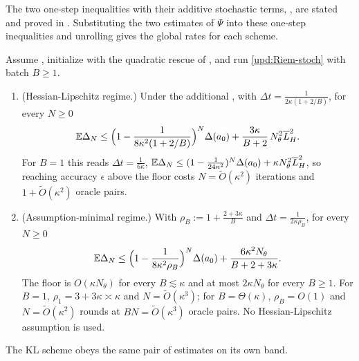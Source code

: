 The two one-step inequalities with their additive stochastic terms,
, are stated and proved in .
Substituting the two estimates of $\Psi$ into these
one-step inequalities and unrolling gives the global rates for each scheme.

\begin{theorem}
\label{thm:stoch-glob-Riem}
Assume , initialize with the quadratic rescue of , and run
\eqref{upd:Riem-stoch} with batch $B\geq1$.
\begin{enumerate}
\item \textup{(Hessian-Lipschitz regime.)} Under the additional , with
$\Delta t=\tfrac1{2\kappa(1+2/B)}$, for every $N\geq0$
\[
    \mathbb{E}\Delta_N\leq\Bigl(1-\frac1{8\kappa^2(1+2/B)}\Bigr)^N\Delta(a_0)+\frac{3\kappa}{B+2}\,N_\theta^2\overline{L}_H^2 .
\]
For $B=1$ this reads $\Delta t=\tfrac1{6\kappa}$,
$\mathbb{E}\Delta_N\leq(1-\tfrac1{24\kappa^2})^N\Delta(a_0)+\kappa N_\theta^2\overline{L}_H^2$, so reaching accuracy
$\epsilon$ above the floor costs $N=\widetilde O(\kappa^2)$ iterations and
$1+\widetilde O(\kappa^2)$ oracle pairs.
\item \textup{(Assumption-minimal regime.)} With $\rho_B:=1+\tfrac{2+3\kappa}B$ and
$\Delta t=\tfrac1{2\kappa\rho_B}$, for every $N\geq0$
\[
    \mathbb{E}\Delta_N\leq\Bigl(1-\frac1{8\kappa^2\rho_B}\Bigr)^N\Delta(a_0)+\frac{6\kappa^2N_\theta}{B+2+3\kappa} .
\]
The floor is $O(\kappa N_\theta)$ for every $B\lesssim\kappa$ and at most $2\kappa N_\theta$ for every
$B\geq1$. For $B=1$, $\rho_1=3+3\kappa\asymp\kappa$ and $N=\widetilde O(\kappa^3)$; for
$B=\Theta(\kappa)$, $\rho_B=O(1)$ and $N=\widetilde O(\kappa^2)$ rounds at
$BN=\widetilde O(\kappa^3)$ oracle pairs. No Hessian-Lipschitz assumption is used.
\end{enumerate}
\end{theorem}

The KL scheme obeys the same pair of estimates on its own band.

